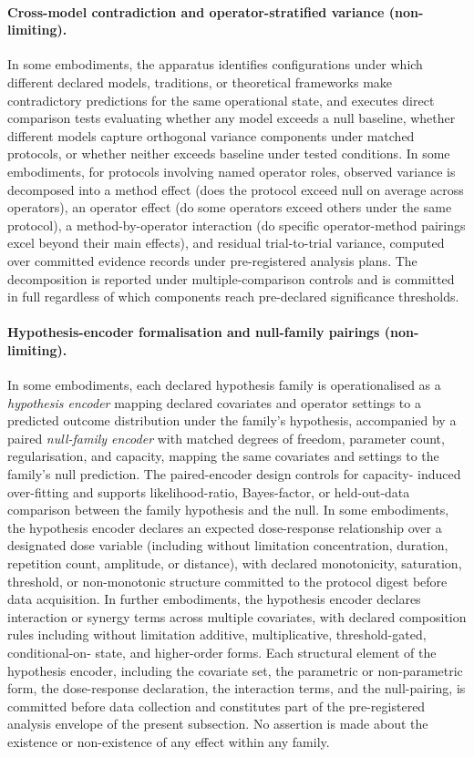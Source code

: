 \documentclass[a4paper,12pt]{article}
\begin{document}
\paragraph{Cross-model contradiction and operator-stratified
  variance (non-limiting).}
In some embodiments, the apparatus identifies configurations under
which different declared models, traditions, or theoretical
frameworks make contradictory predictions for the same operational
state, and executes direct comparison tests evaluating whether any
model exceeds a null baseline, whether different models capture
orthogonal variance components under matched protocols, or whether
neither exceeds baseline under tested conditions. In some
embodiments, for protocols involving named operator roles, observed
variance is decomposed into a method effect (does the protocol
exceed null on average across operators), an operator effect (do
some operators exceed others under the same protocol), a
method-by-operator interaction (do specific operator-method
pairings excel beyond their main effects), and residual
trial-to-trial variance, computed over committed evidence records
under pre-registered analysis plans. The decomposition is reported
under multiple-comparison controls and is committed in full
regardless of which components reach pre-declared significance
thresholds.

\paragraph{Hypothesis-encoder formalisation and null-family pairings
  (non-limiting).}
In some embodiments, each declared hypothesis family is operationalised
as a \emph{hypothesis encoder} mapping declared covariates and operator
settings to a predicted outcome distribution under the family's
hypothesis, accompanied by a paired \emph{null-family encoder} with
matched degrees of freedom, parameter count, regularisation, and
capacity, mapping the same covariates and settings to the family's
null prediction. The paired-encoder design controls for capacity-
induced over-fitting and supports likelihood-ratio, Bayes-factor, or
held-out-data comparison between the family hypothesis and the null.
In some embodiments, the hypothesis encoder declares an expected
dose-response relationship over a designated dose variable (including
without limitation concentration, duration, repetition count,
amplitude, or distance), with declared monotonicity, saturation,
threshold, or non-monotonic structure committed to the protocol
digest before data acquisition. In further embodiments, the hypothesis
encoder declares interaction or synergy terms across multiple
covariates, with declared composition rules including without
limitation additive, multiplicative, threshold-gated, conditional-on-
state, and higher-order forms. Each structural element of the
hypothesis encoder, including the covariate set, the parametric or
non-parametric form, the dose-response declaration, the interaction
terms, and the null-pairing, is committed before data collection and
constitutes part of the pre-registered analysis envelope of the
present subsection. No assertion is made about the existence or
non-existence of any effect within any family.
\end{document}
